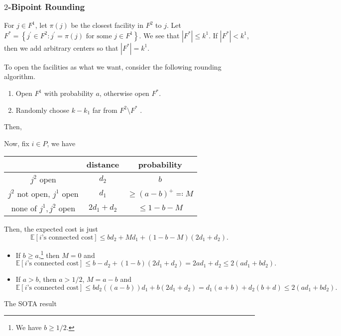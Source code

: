 \subsubsection{\(2\)-Bipoint Rounding}
For \(j\in F^1\), let \(\pi (j)\)  be the closest facility in \(F^2\) to \(j\). Let \(F^{\ast} = \left\{ j^\prime \in F^2 \colon j^\prime =\pi (j) \text{ for some }j\in F^1  \right\} \). We see that \(\left\vert F^{\ast}  \right\vert \leq k^1\). If \(\left\vert F^{\ast}  \right\vert < k^1\), then we add arbitrary centers so that \(\left\vert F^{\ast}  \right\vert = k^1\).

To open the facilities as what we want, consider the following rounding algorithm.
\begin{enumerate}
	\item Open \(F^1\) with probability \(a\), otherwise open \(F^{\ast} \).
	\item Randomly choose \(k - k_1\) far from \(F^2 \setminus F^{\ast} \) .
\end{enumerate}

Then,

Now, fix \(i\in P\), we have
\begin{table}[H]
	\centering
	\begin{tabular}{c|c|c}
		\toprule
		                               & distance       & probability                  \\
		\midrule
		\(j^2\) open                   & \(d_2\)        & \(b\)                        \\
		\(j^2\) not open, \(j^1\) open & \(d_1\)        & \(\geq (a-b)^+ \eqqcolon M\) \\
		none of \(j^1, j^2\) open      & \(2d_1 + d_2\) & \(\leq 1 - b - M\)           \\
		\bottomrule
	\end{tabular}
\end{table}

Then, the expected cost is just
\[
	\mathbb{E}\left[\text{\(i\)'s connected cost}\right] \leq b d_2 + Md_1 + (1 - b - M) (2d_1 + d_2).
\]

\begin{itemize}
	\item If \(b \geq a\),\footnote{We have \(b \geq 1 / 2\).} then \(M = 0\) and
	      \[
		      \mathbb{E}\left[\text{\(i\)'s connected cost}\right] \leq b - d_2 + (1 - b)	(2 d_1 + d_2) = 2ad_1 + d_2 \leq 2(ad_1 + bd_2).
	      \]
	\item If \(a > b\), then \(a > 1 / 2\), \(M = a - b\) and
	      \[
		      \mathbb{E}\left[\text{\(i\)'s connected cost}\right] \leq bd_2 ( (a - b))d_1 + b(2d_1 + d_2) = d_1(a+b)+d_2(b+d) \leq 2(ad_1 + bd_2).
	      \]
\end{itemize}

\begin{remark}[SOTA]
	The SOTA result
\end{remark}